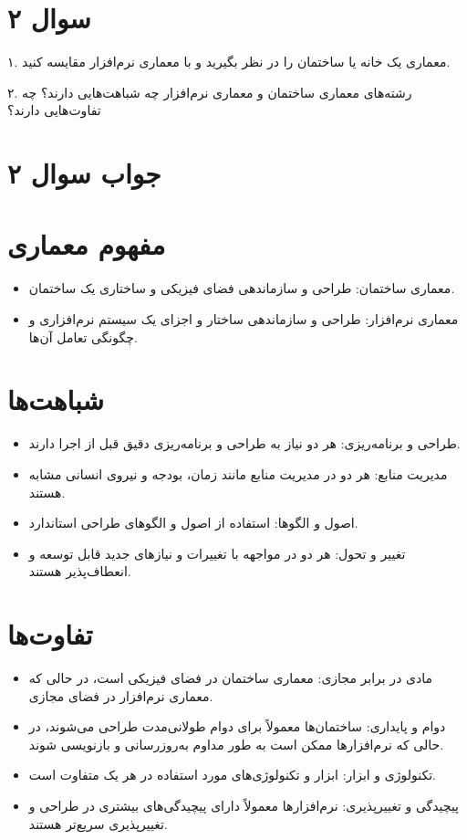 \section*{سوال ۲}

۱. معماری یک خانه یا ساختمان را در نظر بگیرید و با معماری نرم‌افزار مقایسه کنید.

۲. رشته‌های معماری ساختمان و معماری نرم‌افزار چه شباهت‌هایی دارند؟ چه تفاوت‌هایی دارند؟

\section*{جواب سوال ۲}

\section*{مفهوم معماری}
\begin{itemize}
	\item معماری ساختمان: طراحی و سازماندهی فضای فیزیکی و ساختاری یک ساختمان.
	\item معماری نرم‌افزار: طراحی و سازماندهی ساختار و اجزای یک سیستم نرم‌افزاری و چگونگی تعامل آن‌ها.
\end{itemize}

\section*{شباهت‌ها}
\begin{itemize}
	\item طراحی و برنامه‌ریزی: هر دو نیاز به طراحی و برنامه‌ریزی دقیق قبل از اجرا دارند.
	\item مدیریت منابع: هر دو در مدیریت منابع مانند زمان، بودجه و نیروی انسانی مشابه هستند.
	\item اصول و الگوها: استفاده از اصول و الگوهای طراحی استاندارد.
	\item تغییر و تحول: هر دو در مواجهه با تغییرات و نیازهای جدید قابل توسعه و انعطاف‌پذیر هستند.
\end{itemize}

\section*{تفاوت‌ها}
\begin{itemize}
	\item مادی در برابر مجازی: معماری ساختمان در فضای فیزیکی است، در حالی که معماری نرم‌افزار در فضای مجازی.
	\item دوام و پایداری: ساختمان‌ها معمولاً برای دوام طولانی‌مدت طراحی می‌شوند، در حالی که نرم‌افزارها ممکن است به طور مداوم به‌روزرسانی و بازنویسی شوند.
	\item تکنولوژی و ابزار: ابزار و تکنولوژی‌های مورد استفاده در هر یک متفاوت است.
	\item پیچیدگی و تغییرپذیری: نرم‌افزارها معمولاً دارای پیچیدگی‌های بیشتری در طراحی و تغییرپذیری سریع‌تر هستند.
\end{itemize}